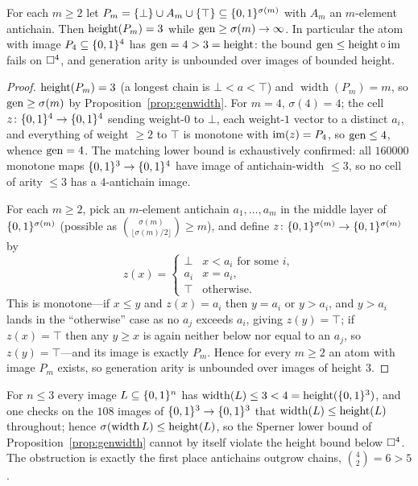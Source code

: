 \begin{prop}\label{prop:nobound}
  For each $m\ge2$ let $P_m=\{\bot\}\cup A_m\cup\{\top\}\subseteq\{0,1\}^{\sigma(m)}$
  with $A_m$ an $m$-element antichain.  Then $\operatorname{height}(P_m)=3$ while
  $\operatorname{gen}\ge\sigma(m)\to\infty$.  In particular the atom with image
  $P_4\subseteq\{0,1\}^4$ has $\operatorname{gen}=4>3=\operatorname{height}$: the bound
  $\operatorname{gen}\le\operatorname{height}\circ\operatorname{im}$ fails on $\square^4$, and generation arity is
  unbounded over images of bounded height.
\end{prop}
\begin{proof}
  $\operatorname{height}(P_m)=3$ (a longest chain is $\bot<a<\top$) and
  $\operatorname{width}(P_m)=m$, so $\operatorname{gen}\ge\sigma(m)$ by
  Proposition~\ref{prop:genwidth}.  For $m=4$, $\sigma(4)=4$; the cell
  $z\colon\{0,1\}^4\to\{0,1\}^4$ sending weight-$0$ to $\bot$, each weight-$1$
  vector to a distinct $a_i$, and everything of weight $\ge2$ to $\top$ is
  monotone with $\operatorname{im}(z)=P_4$, so $\operatorname{gen}\le4$, whence $\operatorname{gen}=4$.  The
  matching lower bound is exhaustively confirmed: all $160000$ monotone
  maps $\{0,1\}^3\to\{0,1\}^4$ have image of antichain-width $\le3$, so no cell of
  arity $\le3$ has a $4$-antichain image.

  For each $m\ge2$, pick an $m$-element antichain $a_1,\dots,a_m$ in the
  middle layer of $\{0,1\}^{\sigma(m)}$ (possible as
  $\binom{\sigma(m)}{\lfloor\sigma(m)/2\rfloor}\ge m$), and define
  $z\colon\{0,1\}^{\sigma(m)}\to\{0,1\}^{\sigma(m)}$ by
  \[
    z(x)=\begin{cases}
    \bot & x<a_i\text{ for some }i,\\
    a_i & x=a_i,\\
    \top & \text{otherwise.}
    \end{cases}
  \]
  This is monotone---if $x\le y$ and $z(x)=a_i$ then $y=a_i$ or $y>a_i$,
  and $y>a_i$ lands in the ``otherwise'' case as no $a_j$ exceeds $a_i$,
  giving $z(y)=\top$; if $z(x)=\top$ then any $y\ge x$ is again neither
  below nor equal to an $a_j$, so $z(y)=\top$---and its image is exactly
  $P_m$.  Hence for every $m\ge2$ an atom with image $P_m$ exists, so
  generation arity is unbounded over images of height $3$.
\end{proof}

\begin{rem}
  For $n\le3$ every image $L\subseteq\{0,1\}^n$ has
  $\operatorname{width}(L)\le3<4=\operatorname{height}(\{0,1\}^3)$, and one checks on the $108$
  images of $\{0,1\}^3\to\{0,1\}^3$ that $\operatorname{width}(L)\le\operatorname{height}(L)$
  throughout; hence $\sigma(\operatorname{width}L)\le\operatorname{height}(L)$, so the
  Sperner lower bound of Proposition~\ref{prop:genwidth} cannot by itself
  violate the height bound below $\square^4$.  The obstruction is exactly
  the first place antichains outgrow chains, $\binom{4}{2}=6>5$.
\end{rem}

